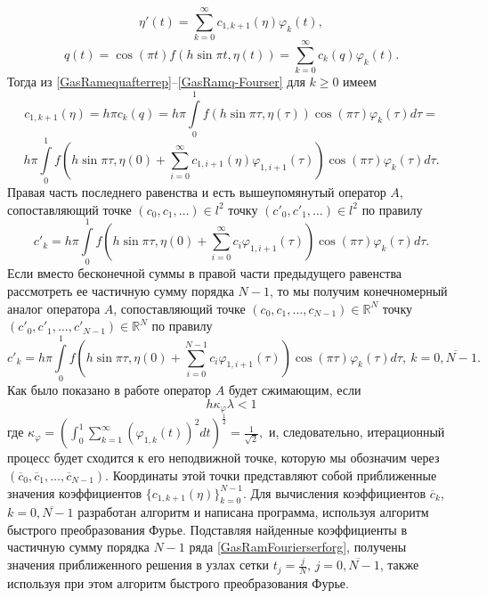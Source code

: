 \begin{equation}\label{GasRamg-Fourser}
\eta{'}(t) =  \sum_{k=0}^\infty c_{1,k+1}(\eta)\varphi_k(t),
\end{equation}
\begin{equation}\label{GasRamq-Fourser}
q(t)=\cos(\pi t) f(h\sin \pi t,\eta(t)) = \sum_{k=0}^\infty c_{k}(q)\varphi_k(t).
\end{equation}
Тогда из \eqref{GasRamequafterrep}--\eqref{GasRamq-Fourser} для $k\geq0$ имеем
$$
c_{1,k+1}(\eta)=h\pi c_{k}(q)=h\pi\int\limits_0^1 f(h\sin \pi \tau,\eta(\tau))\cos(\pi \tau)\varphi_k(\tau)d\tau=
$$
$$
h\pi\int\limits_0^1 f\left(h\sin \pi \tau, \eta(0)+\sum_{i=0}^\infty c_{1,i+1}(\eta)\varphi_{1,i+1}(\tau)\right)\cos(\pi \tau)\varphi_k(\tau)d\tau.
$$
Правая часть последнего равенства и есть вышеупомянутый оператор $A$, сопоставляющий точке $(c_0,c_1, \ldots)\in l^2$ точку $(c'_0,c'_1, \ldots)\in l^2$ по правилу
$$
c'_k=h\pi\int\limits_0^1 f\left(h\sin \pi \tau, \eta(0)+\sum_{i=0}^\infty c_{i}\varphi_{1,i+1}(\tau)\right)\cos(\pi \tau)\varphi_k(\tau)d\tau.
$$
Если вместо бесконечной суммы в правой части предыдущего равенства рассмотреть ее частичную сумму порядка $N-1$, то мы получим конечномерный аналог оператора $A$, сопоставляющий точке $(c_0,c_1, \ldots, c_{N-1})\in \mathbb{R}^N$ точку $(c'_0,c'_1, \ldots, c'_{N-1})\in \mathbb{R}^N$ по правилу
$$
c'_k=h\pi\int\limits_0^1 f\left(h\sin \pi \tau, \eta(0)+\sum_{i=0}^{N-1} c_{i}\varphi_{1,i+1}(\tau)\right)\cos(\pi \tau)\varphi_k(\tau)d\tau,\ k=\overline{0, N-1}.
$$
Как было показано в работе \cite{RamSharDemr} оператор $A$ будет сжимающим, если
\begin{equation}\label{GasRamconditionfor_h}
h\kappa_\varphi\lambda<1
\end{equation}
где
$
\kappa_{\varphi}=\left(\int_0^1\sum_{k=1}^{\infty}
(\varphi_{1,k}(t))  ^2dt\right)^{\frac12}=\frac{1}{\sqrt{2}},
$
и, следовательно, итерационный процесс будет сходится к его неподвижной точке, которую мы обозначим через $(\overline{c}_0,\overline{c}_1, \ldots, \overline{c}_{N-1})$. Координаты этой точки представляют собой приближенные значения коэффициентов $\{c_{1,k+1}(\eta)\}_{k=0}^{N-1}$.
Для вычисления коэффициентов $\overline{c}_k$, $k=\overline{0, N-1}$ разработан алгоритм и написана программа, используя алгоритм быстрого преобразования Фурье.
Подставляя найденные коэффициенты в частичную сумму порядка $N-1$ ряда \eqref{GasRamFourierserforg}, получены значения приближенного решения в узлах сетки $t_j=\frac{j}{N}$, $j=\overline{0, N-1}$, также используя при этом алгоритм быстрого преобразования Фурье.

